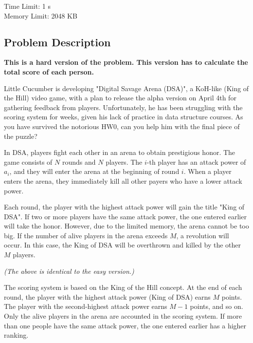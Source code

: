 \providecommand{\tightlist}{\setlength{\itemsep}{0pt}\setlength{\parskip}{0pt}}
\setcounter{secnumdepth}{0}

Time Limit: 1 s \\
Memory Limit: 2048 KB
\vspace{-15pt}

\subsection{Problem Description}\label{problem-description}

\textbf{This is a hard version of the problem. This version has to calculate the total score of each person.}
\vspace{6pt}

Little Cucumber is developing "Digital Savage Arena (DSA)", a KoH-like (King of the Hill) video game, with a plan to release the alpha version on April 4th for gathering feedback from players. Unfortunately, he has been struggling with the scoring system for weeks, given his lack of practice in data structure courses. As you have survived the notorious HW0, can you help him with the final piece of the puzzle?

In DSA, players fight each other in an arena to obtain prestigious honor. The game consists of $N$ rounds and $N$ players. The $i$-th player has an attack power of $a_i$, and they will enter the arena at the beginning of round $i$. When a player enters the arena, they immediately kill all other payers who have a lower attack power. 

Each round, the player with the highest attack power will gain the title "King of DSA". If two or more players have the same attack power, the one entered earlier will take the honor. However, due to the limited memory, the arena cannot be too big. If the number of alive players in the arena exceeds $M$, a revolution will occur. In this case, the King of DSA will be overthrown and killed by the other $M$ players. 

\vspace{10pt}
\textit{(The above is identical to the easy version.)}
\vspace{10pt}

The scoring system is based on the King of the Hill concept. At the end of each round, the player with the highest attack power (King of DSA) earns $M$ points. The player with the second-highest attack power earns $M-1$ points, and so on. Only the alive players in the arena are accounted in the scoring system. If more than one people have the same attack power, the one entered earlier has a higher ranking. 

